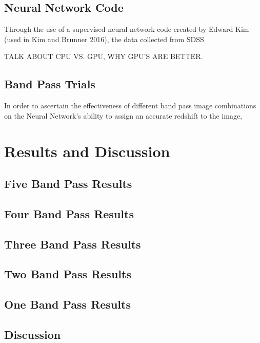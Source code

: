 \documentclass[fleqn,usenatbib]{mnras}
\begin{document}
\subsection{Neural Network Code}
  \label{sec:code}
Through the use of a supervised neural network code created by Edward Kim (used in Kim and Brunner 2016), the data collected from SDSS

TALK ABOUT CPU VS. GPU, WHY GPU'S ARE BETTER.

\subsection{Band Pass Trials}
   \label{sec:bandmethod}
In order to ascertain the effectiveness of different band pass image combinations on the Neural Network's ability to assign an accurate redshift to the image, 

\section{Results and Discussion}
  \label{sec:results_and_discussion}
  
\subsection{Five Band Pass Results}
  \label{sec:five_bp_res}

\subsection{Four Band Pass Results}
  \label{sec:four_bp_res}
  
\subsection{Three Band Pass Results}
  \label{sec:three_bp_res}
  
\subsection{Two Band Pass Results}
  \label{sec:two_bp_res}

\subsection{One Band Pass Results}
  \label{sec:one_bp_res}
  
\subsection{Discussion}
  \label{sec:Discussion}
  
\end{document}
